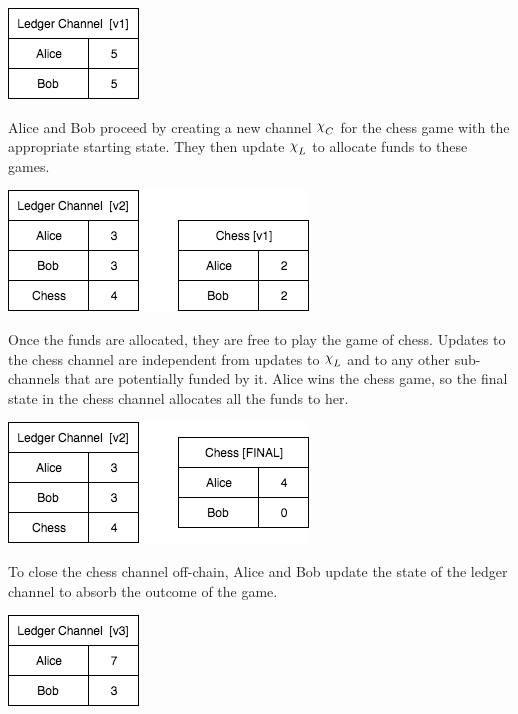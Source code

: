 \documentclass{article}
\DeclareRobustCommand{\rchi}{{\mathpalette\irchi\relax}}
\newcommand{\irchi}[2]{\raisebox{\depth}{$#1\chi$}} %
\theoremstyle{definition}
\begin{document}
\begin{center}
  \includegraphics[scale=0.5]{turbo_start} %
\end{center}

Alice and Bob proceed by creating a new channel $\rchi_C$ for the chess game with the appropriate starting state.
They then update $\rchi_L$ to allocate funds to these games.

\begin{center}
  \includegraphics[scale=0.5]{turbo_open} %
\end{center}

Once the funds are allocated, they are free to play the game of chess.
Updates to the chess channel are independent from updates to $\rchi_L$ and to
any other sub-channels that are potentially funded by it. 
Alice wins the chess game, so the final state in the chess channel allocates all the
funds to her.

\begin{center}
  \includegraphics[scale=0.5]{turbo_close} %
\end{center}

To close the chess channel off-chain, Alice and Bob update the state of the ledger channel to absorb the outcome of the game.

\begin{center}
  \includegraphics[scale=0.5]{turbo_finish} %
\end{center}
\end{document}
